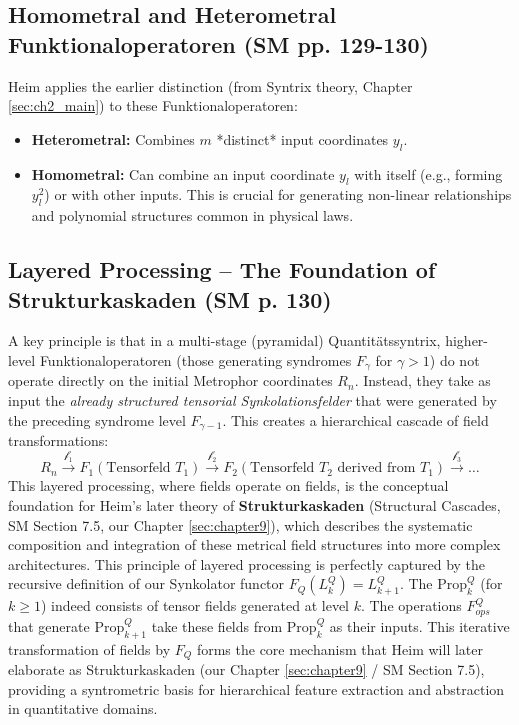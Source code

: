 \documentclass[
    12pt,              %
    a4paper,           %
    headings=normal,   %
    twoside=true,      %
    BCOR=8mm,          %
]{scrbook}
\newcommand{\syndrom}{F}
\newcommand{\semantischermetrophor}{R_n}
\newcommand{\funktionaloperator}{\mathcal{f}}
\begin{document}
\subsection{Homometral and Heterometral Funktionaloperatoren (SM pp. 129-130)}
\label{sec:ch7_2_5_homo_hetero_funktionalop}
Heim applies the earlier distinction (from Syntrix theory, Chapter \ref{sec:ch2_main}) to these Funktionaloperatoren:
\begin{itemize}
    \item   \textbf{Heterometral:} Combines \(m\) *distinct* input coordinates \(y_l\).
    \item   \textbf{Homometral:} Can combine an input coordinate \(y_l\) with itself (e.g., forming \(y_l^2\)) or with other inputs. This is crucial for generating non-linear relationships and polynomial structures common in physical laws.
\end{itemize}

\subsection{Layered Processing – The Foundation of Strukturkaskaden (SM p. 130)}
\label{sec:ch7_2_6_layered_processing_kaskaden}
A key principle is that in a multi-stage (pyramidal) Quantitätssyntrix, higher-level Funktionaloperatoren (those generating syndromes \(\syndrom_\gamma\) for \(\gamma > 1\)) do not operate directly on the initial Metrophor coordinates \(\semantischermetrophor\). Instead, they take as input the \textit{already structured tensorial Synkolationsfelder} that were generated by the preceding syndrome level \(\syndrom_{\gamma-1}\).
This creates a hierarchical cascade of field transformations:
\[ \semantischermetrophor \xrightarrow{\funktionaloperator_1} \syndrom_1 (\text{Tensorfeld } T_1) \xrightarrow{\funktionaloperator_2} \syndrom_2 (\text{Tensorfeld } T_2 \text{ derived from } T_1) \xrightarrow{\funktionaloperator_3} \ldots \]
This layered processing, where fields operate on fields, is the conceptual foundation for Heim's later theory of \textbf{Strukturkaskaden} (Structural Cascades, SM Section 7.5, our Chapter \ref{sec:chapter9}), which describes the systematic composition and integration of these metrical field structures into more complex architectures.
This principle of layered processing is perfectly captured by the recursive definition of our Synkolator functor \(F_Q(L_k^Q) = L_{k+1}^Q\). The \(\text{Prop}_k^Q\) (for \(k \ge 1\)) indeed consists of tensor fields generated at level \(k\). The operations \(F_{ops}^Q\) that generate \(\text{Prop}_{k+1}^Q\) take these fields from \(\text{Prop}_k^Q\) as their inputs. This iterative transformation of fields by \(F_Q\) forms the core mechanism that Heim will later elaborate as Strukturkaskaden (our Chapter \ref{sec:chapter9} / SM Section 7.5), providing a syntrometric basis for hierarchical feature extraction and abstraction in quantitative domains.
\end{document}

